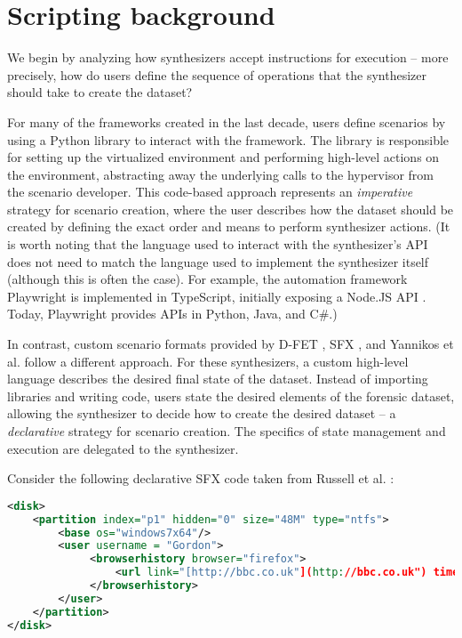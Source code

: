 \documentclass[letterpaper,12pt]{report}
\begin{document}
\section{Scripting background}\label{scripting-background}

We begin by analyzing how synthesizers accept instructions for execution
-- more precisely, how do users define the sequence of operations that
the synthesizer should take to create the dataset?

For many of the frameworks created in the last decade, users define
scenarios by using a Python library to interact with the framework. The
library is responsible for setting up the virtualized environment and
performing high-level actions on the environment, abstracting away the
underlying calls to the hypervisor from the scenario developer. This
code-based approach represents an \emph{imperative} strategy for
scenario creation, where the user describes how the dataset should be
created by defining the exact order and means to perform synthesizer
actions. (It is worth noting that the language used to interact with the
synthesizer's API does not need to match the language used to implement
the synthesizer itself (although this is often the case). For example,
the automation framework Playwright is implemented in TypeScript,
initially exposing a Node.JS API
\cite{MicrosoftPlaywrightpython2025}. Today, Playwright provides
APIs in Python, Java, and C\#.)

In contrast, custom scenario formats provided by D-FET
\cite{williamCloudbasedDigitalForensics2011}, SFX
\cite{russellForensicImageDescription2012}, and Yannikos et al.
\cite{yannikosDataCorporaDigital2014} follow a different approach.
For these synthesizers, a custom high-level language describes the
desired final state of the dataset. Instead of importing libraries and
writing code, users state the desired elements of the forensic dataset,
allowing the synthesizer to decide how to create the desired dataset --
a \emph{declarative} strategy for scenario creation. The specifics of
state management and execution are delegated to the synthesizer.

Consider the following declarative SFX code taken from Russell et al.
\cite{russellForensicImageDescription2012}:

\begin{lstlisting}[language=XML]
<disk>
    <partition index="p1" hidden="0" size="48M" type="ntfs">
        <base os="windows7x64"/>
        <user username = "Gordon">
             <browserhistory browser="firefox">
                 <url link="[http://bbc.co.uk"](http://bbc.co.uk") time="13:14:00 1 Jan 2013"/>
             </browserhistory>
        </user>
    </partition>
</disk>
\end{lstlisting}
\end{document}
